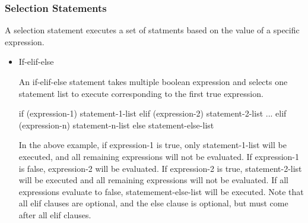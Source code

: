 \documentclass[oneside]{book}
\begin{document}
\subsubsection{Selection Statements}

A selection statement executes a set of statments based on the value of a specific expression.

\begin{itemize}
\item If-elif-else

An if-elif-else statement takes multiple boolean expression and selects one statement list to execute corresponding to the first true expression. 

\begin{code}
if (expression-1)
{
  statement-1-list
}
elif (expression-2)
{
  statement-2-list
}
...
elif (expression-n)
{
  statement-n-list
}
else
{
  statement-else-list
}
\end{code}

In the above example, if expression-1 is true, only statement-1-list will be executed, and all remaining expressions will not be evaluated. If expression-1 is false, expression-2 will be evaluated. If expression-2 is true, statement-2-list will be executed and all remaining expressions will not be evaluated. If all expressions evaluate to false, statemement-else-list will be executed. Note that all elif clauses are optional, and the else clause is optional, but must come after all elif clauses.

\end{itemize}
\end{document}
